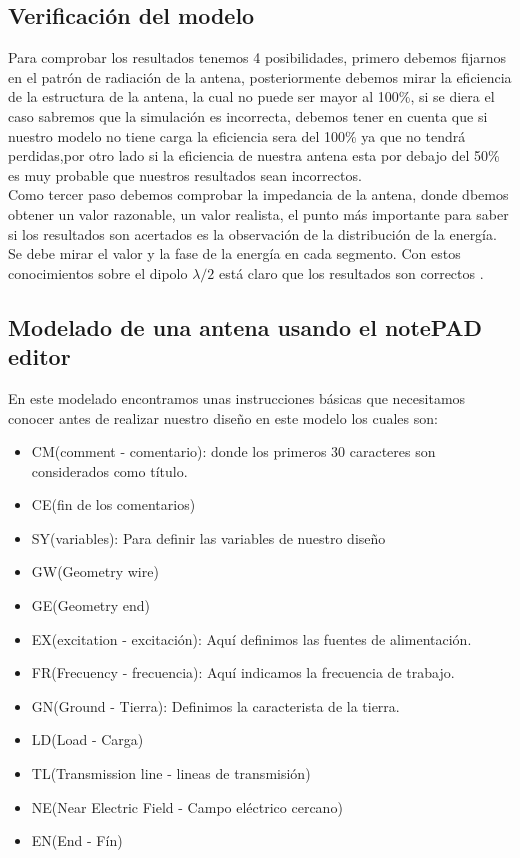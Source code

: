 \documentclass[11pt,a4paper]{article}
\begin{document}
\subsection{Verificación del modelo}\label{sec:3.2}
Para comprobar los resultados tenemos 4 posibilidades, primero debemos fijarnos en el patrón de radiación de la antena, posteriormente debemos mirar la eficiencia de la estructura de la antena, la cual no puede ser mayor al 100\%, si se diera el caso sabremos que la simulación es incorrecta, debemos tener en cuenta que si nuestro modelo no tiene carga la eficiencia sera del 100\% ya que no tendrá perdidas,por otro lado si la eficiencia de nuestra antena esta por debajo del 50\% es muy probable que nuestros resultados sean incorrectos.\\
Como tercer paso debemos comprobar la impedancia de la antena, donde dbemos obtener un valor razonable, un valor realista, el punto más importante para saber si los resultados son acertados es la observación de la distribución de la energía. Se debe mirar el valor y la fase de la energía en cada segmento. Con estos conocimientos sobre el dipolo $\lambda/2$ está claro que los resultados son correctos .\\

\subsection{Modelado de una antena usando el notePAD editor}\label{sec:3.3}
En este modelado encontramos unas instrucciones básicas que necesitamos conocer antes de realizar nuestro diseño en este modelo los cuales son:
\begin{itemize}
    \item CM(comment - comentario): donde los primeros 30 caracteres son considerados como título.
    \item CE(fin de los comentarios)
    \item SY(variables): Para definir las variables de nuestro diseño
    \item GW(Geometry wire)
    \item GE(Geometry end)
    \item EX(excitation - excitación): Aquí definimos las fuentes de alimentación.
    \item FR(Frecuency - frecuencia): Aquí indicamos la frecuencia de trabajo.
    \item GN(Ground - Tierra): Definimos la caracterista de la tierra.
    \item LD(Load - Carga)
    \item TL(Transmission line - lineas de transmisión)
    \item NE(Near Electric Field - Campo eléctrico cercano)
    \item EN(End - Fín)
\end{itemize}
\end{document}

